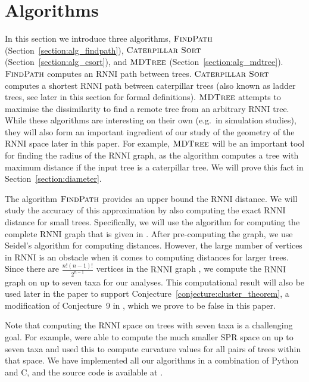 \documentclass{amsart}
\newcommand{\rnni}{\mathrm{RNNI}}
\newcommand{\spr}{\mathrm{SPR}}
\newcommand{\csort}{\textsc{Caterpillar Sort}}
\newcommand{\findpath}{\textsc{FindPath}}
\newcommand{\mdtree}{\textsc{MDTree}}
\begin{document}
\section{Algorithms}
\label{section:algorithms}

In this section we introduce three algorithms, $\findpath$ (Section~\ref{section:alg_findpath}), $\csort$ (Section~\ref{section:alg_csort}), and $\mdtree$ (Section~\ref{section:alg_mdtree}).
$\findpath$ computes an $\rnni$ path between trees.
$\csort$ computes a shortest $\rnni$ path between caterpillar trees (also known as ladder trees, see later in this section for formal definitions).
$\mdtree$ attempts to maximise the dissimilarity to find a remote tree from an arbitrary $\rnni$ tree.
While these algorithms are interesting on their own (e.g.\ in simulation studies), they will also form an important ingredient of our study of the geometry of the $\rnni$ space later in this paper.
For example, $\mdtree$ will be an important tool for finding the radius of the $\rnni$ graph, as the algorithm computes a tree with maximum distance if the input tree is a caterpillar tree.
We will prove this fact in Section~\ref{section:diameter}.

The algorithm $\findpath$ provides an upper bound the $\rnni$ distance.
We will study the accuracy of this approximation by also computing the exact $\rnni$ distance for small trees.
Specifically, we will use the algorithm for computing the complete $\rnni$ graph that is given in \autocite[Section 3.3]{Gavryushkin2018-ol}.
After pre-computing the graph, we use Seidel's algorithm \autocite{seidel_all-pairs-shortest-path_1995} for computing distances.
However, the large number of vertices in $\rnni$ is an obstacle when it comes to computing distances for larger trees.
Since there are $\frac{n!(n-1)!}{2^{n-1}}$ vertices in the $\rnni$ graph \autocite{Gavryushkin2018-ol}, we compute the $\rnni$ graph on up to seven taxa for our analyses.
This computational result will also be used later in the paper to support Conjecture~\ref{conjecture:cluster_theorem}, a modification of Conjecture~9 in \autocite{Gavryushkin2018-ol}, which we prove to be false in this paper.

Note that computing the $\rnni$ space on trees with seven taxa is a challenging goal.
For example, \textcite{Whidden2016-kl} were able to compute the much smaller $\spr$ space on up to seven taxa and used this to compute curvature values for all pairs of trees within that space.
We have implemented all our algorithms in a combination of Python and C, and the source code is available at \autocite{Collienne2019}.
\end{document}

